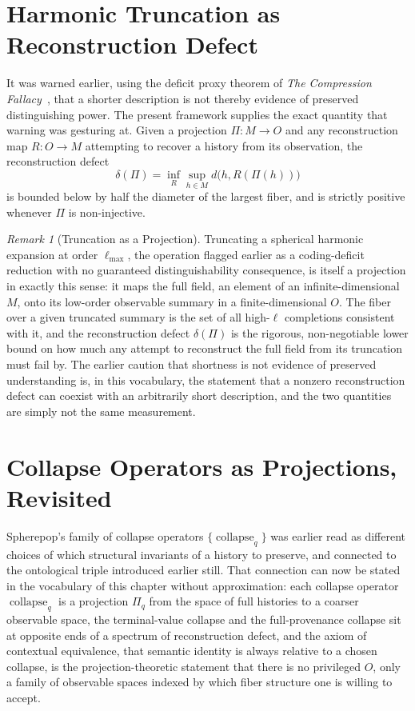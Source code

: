 \documentclass[11pt,fleqn]{book}
\numberwithin{equation}{chapter}
\theoremstyle{plain}
\theoremstyle{definition}
\theoremstyle{remark}
\newtheorem{remark}[theorem]{Remark}
\providecommand{\scollapse}[1]{\operatorname{collapse}_{#1}}
\begin{document}
\section{Harmonic Truncation as Reconstruction Defect}

It was warned earlier, using the deficit proxy theorem of \emph{The Compression Fallacy}~\cite{compression-fallacy}, that a shorter description is not thereby evidence of preserved distinguishing power. The present framework supplies the exact quantity that warning was gesturing at. Given a projection \(\Pi:M\to O\) and any reconstruction map \(R:O\to M\) attempting to recover a history from its observation, the reconstruction defect
\begin{equation}
\delta(\Pi) = \inf_R \sup_{h\in M} d\bigl(h, R(\Pi(h))\bigr)
\end{equation}
is bounded below by half the diameter of the largest fiber, and is strictly positive whenever \(\Pi\) is non-injective.

\begin{remark}[Truncation as a Projection]
Truncating a spherical harmonic expansion at order \(\ell_{\max}\), the operation flagged earlier as a coding-deficit reduction with no guaranteed distinguishability consequence, is itself a projection in exactly this sense: it maps the full field, an element of an infinite-dimensional \(M\), onto its low-order observable summary in a finite-dimensional \(O\). The fiber over a given truncated summary is the set of all high-\(\ell\) completions consistent with it, and the reconstruction defect \(\delta(\Pi)\) is the rigorous, non-negotiable lower bound on how much any attempt to reconstruct the full field from its truncation must fail by. The earlier caution that shortness is not evidence of preserved understanding is, in this vocabulary, the statement that a nonzero reconstruction defect can coexist with an arbitrarily short description, and the two quantities are simply not the same measurement.
\end{remark}

\section{Collapse Operators as Projections, Revisited}

Spherepop's family of collapse operators \(\{\scollapse{q}\}\) was earlier read as different choices of which structural invariants of a history to preserve, and connected to the ontological triple introduced earlier still. That connection can now be stated in the vocabulary of this chapter without approximation: each collapse operator \(\scollapse{q}\) is a projection \(\Pi_q\) from the space of full histories to a coarser observable space, the terminal-value collapse and the full-provenance collapse sit at opposite ends of a spectrum of reconstruction defect, and the axiom of contextual equivalence, that semantic identity is always relative to a chosen collapse, is the projection-theoretic statement that there is no privileged \(O\), only a family of observable spaces indexed by which fiber structure one is willing to accept.
\end{document}
